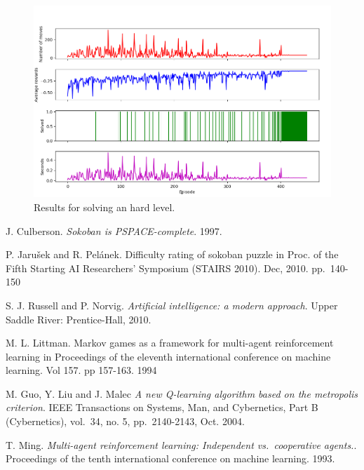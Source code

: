 \documentclass[times, 10pt,twocolumn]{article}
\begin{document}
\begin{figure}[h] 
  \centering
     \includegraphics[width=\linewidth]{images/hard_graph.png}
  \caption{Results for solving an hard level.}
  \label{fig:h}
\end{figure}






\begin{thebibliography}{9}
J. Culberson. 
\textit{Sokoban is PSPACE-complete}.
1997.

P. Jarušek and R. Pelánek.
Difficulty rating of sokoban puzzle
in Proc. of the Fifth Starting AI Researchers' Symposium (STAIRS 2010).
Dec, 2010. pp.~140-150

S. J. Russell and P. Norvig.
\textit{Artificial intelligence: a modern approach}.
Upper Saddle River: Prentice-Hall, 2010.

M. L. Littman.
Markov games as a framework for multi-agent
reinforcement learning in Proceedings of the eleventh international
conference on machine learning. Vol 157. pp 157-163. 1994

M. Guo, Y. Liu and J. Malec
\textit{A new Q-learning algorithm based on the metropolis criterion}.
IEEE Transactions on Systems, Man, and Cybernetics, Part B (Cybernetics), vol.~34, no. 5, pp.~2140-2143, Oct. 2004.

T. Ming.
\textit{Multi-agent reinforcement learning: Independent vs.~cooperative agents.}.
Proceedings of the tenth international conference on machine learning. 1993.

\end{thebibliography}
\end{document}
